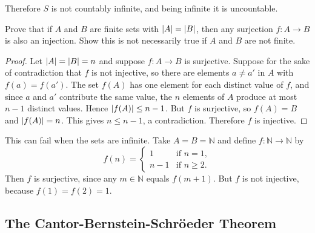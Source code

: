 \documentclass[DIN, pagenumber=false, fontsize=11pt, parskip=half]{scrartcl}
\begin{document}
\begin{problems}
    Therefore $S$ is not countably infinite, and being infinite it is uncountable.

    \problem Prove that if $A$ and $B$ are finite sets with $\lvert A \rvert = \lvert B \rvert$, then any surjection $f : A \to B$ is also an injection. Show this is not necessarily true if $A$ and $B$ are not finite.
    \begin{proof}
        Let $\lvert A \rvert = \lvert B \rvert = n$ and suppose $f : A \to B$ is surjective. Suppose for the sake of contradiction that $f$ is not injective, so there are elements $a \neq a'$ in $A$ with $f(a) = f(a')$. The set $f(A)$ has one element for each distinct value of $f$, and since $a$ and $a'$ contribute the same value, the $n$ elements of $A$ produce at most $n-1$ distinct values. Hence $\lvert f(A) \rvert \leq n-1$. But $f$ is surjective, so $f(A) = B$ and $\lvert f(A) \rvert = n$. This gives $n \leq n-1$, a contradiction. Therefore $f$ is injective.
    \end{proof}

    \answer This can fail when the sets are infinite. Take $A = B = \mathbb{N}$ and define $f : \mathbb{N} \to \mathbb{N}$ by
    \[
        f(n) = \begin{cases}
            1   & \text{if } n = 1,\\
            n-1 & \text{if } n \geq 2.
        \end{cases}
    \]
    Then $f$ is surjective, since any $m \in \mathbb{N}$ equals $f(m+1)$. But $f$ is not injective, because $f(1) = f(2) = 1$.
\end{problems}

\subsection{The Cantor-Bernstein-Schröeder Theorem}
\end{document}
